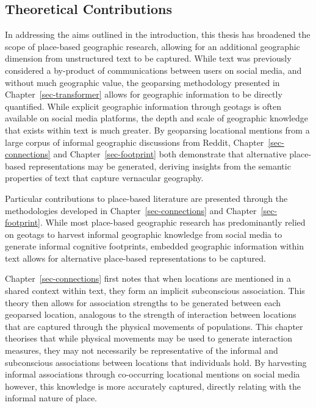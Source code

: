 \documentclass[
  letterpaper,
  11pt,
  english,
  onehalfspacing,
  headsepline]{MastersDoctoralThesis}
\begin{document}
\hypertarget{theoretical-contributions}{%
\subsection{Theoretical Contributions}\label{theoretical-contributions}}

In addressing the aims outlined in the introduction, this thesis has
broadened the scope of place-based geographic research, allowing for an
additional geographic dimension from unstructured text to be captured.
While text was previously considered a by-product of communications
between users on social media, and without much geographic value, the
geoparsing methodology presented in Chapter~\ref{sec-transformer} allows
for geographic information to be directly quantified. While explicit
geographic information through geotags is often available on social
media platforms, the depth and scale of geographic knowledge that exists
within text is much greater. By geoparsing locational mentions from a
large corpus of informal geographic discussions from Reddit,
Chapter~\ref{sec-connections} and Chapter~\ref{sec-footprint} both
demonstrate that alternative place-based representations may be
generated, deriving insights from the semantic properties of text that
capture vernacular geography.

Particular contributions to place-based literature are presented through
the methodologies developed in Chapter~\ref{sec-connections} and
Chapter~\ref{sec-footprint}. While most place-based geographic research
has predominantly relied on geotags to harvest informal geographic
knowledge from social media to generate informal cognitive footprints,
embedded geographic information within text allows for alternative
place-based representations to be captured.

Chapter~\ref{sec-connections} first notes that when locations are
mentioned in a shared context within text, they form an implicit
subconscious association. This theory then allows for association
strengths to be generated between each geoparsed location, analogous to
the strength of interaction between locations that are captured through
the physical movements of populations. This chapter theorises that while
physical movements may be used to generate interaction measures, they
may not necessarily be representative of the informal and subconscious
associations between locations that individuals hold. By harvesting
informal associations through co-occurring locational mentions on social
media however, this knowledge is more accurately captured, directly
relating with the informal nature of place.
\end{document}
